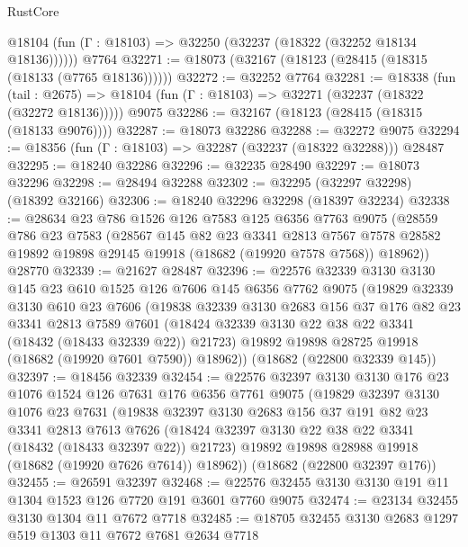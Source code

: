 \begin{lexlean}{RustCore}
\begin{coremodule}
      @18104 (fun (Γ : @18103) => @32250 (@32237 (@18322 (@32252 @18134 @18136))))))
    @7764
@32271 := @18073 (@32167 (@18123 (@28415 (@18315 (@18133 (@7765 @18136))))))
@32272 := @32252 @7764
@32281 := @18338
    (fun (tail : @2675) => @18104 (fun (Γ : @18103) => @32271 (@32237 (@18322 (@32272 @18136)))))
    @9075
@32286 := @32167 (@18123 (@28415 (@18315 (@18133 @9076))))
@32287 := @18073 @32286
@32288 := @32272 @9075
@32294 := @18356 (fun (Γ : @18103) => @32287 (@32237 (@18322 @32288))) @28487
@32295 := @18240 @32286
@32296 := @32235 @28490
@32297 := @18073 @32296
@32298 := @28494 @32288
@32302 := @32295 (@32297 @32298) (@18392 @32166)
@32306 := @18240 @32296 @32298 (@18397 @32234)
@32338 := @28634
    @23
    @786
    @1526
    @126
    @7583
    @125
    @6356
    @7763
    @9075
    (@28559
      @786
      @23
      @7583
      (@28567
        @145
        @82
        @23
        @3341
        @2813
        @7567
        @7578
        @28582
        @19892
        @19898
        @29145
        @19918
        (@18682 (@19920 @7578 @7568))
        @18962))
    @28770
@32339 := @21627 @28487
@32396 := @22576
    @32339
    @3130
    @3130
    @145
    @23
    @610
    @1525
    @126
    @7606
    @145
    @6356
    @7762
    @9075
    (@19829
      @32339
      @3130
      @610
      @23
      @7606
      (@19838
        @32339
        @3130
        @2683
        @156
        @37
        @176
        @82
        @23
        @3341
        @2813
        @7589
        @7601
        (@18424 @32339 @3130 @22 @38 @22 @3341 (@18432 (@18433 @32339 @22)) @21723)
        @19892
        @19898
        @28725
        @19918
        (@18682 (@19920 @7601 @7590))
        @18962))
    (@18682 (@22800 @32339 @145))
@32397 := @18456 @32339
@32454 := @22576
    @32397
    @3130
    @3130
    @176
    @23
    @1076
    @1524
    @126
    @7631
    @176
    @6356
    @7761
    @9075
    (@19829
      @32397
      @3130
      @1076
      @23
      @7631
      (@19838
        @32397
        @3130
        @2683
        @156
        @37
        @191
        @82
        @23
        @3341
        @2813
        @7613
        @7626
        (@18424 @32397 @3130 @22 @38 @22 @3341 (@18432 (@18433 @32397 @22)) @21723)
        @19892
        @19898
        @28988
        @19918
        (@18682 (@19920 @7626 @7614))
        @18962))
    (@18682 (@22800 @32397 @176))
@32455 := @26591 @32397
@32468 := @22576 @32455 @3130 @3130 @191 @11 @1304 @1523 @126 @7720 @191 @3601 @7760 @9075
@32474 := @23134 @32455 @3130 @1304 @11 @7672 @7718
@32485 := @18705 @32455 @3130 @2683 @1297 @519 @1303 @11 @7672 @7681 @2634 @7718

\end{coremodule}
\end{lexlean}
